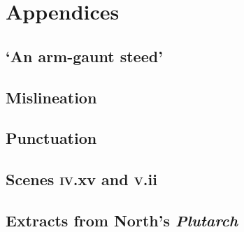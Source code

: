 \documentclass{book}
\begin{document}


\chapter {Appendices}

\section{`An arm-gaunt steed'}

\noindent\lorem [2314]

\section{Mislineation}

\noindent\lorem [14312]

\section{Punctuation}

\noindent\lorem [22315]

\section{Scenes \textsc{iv}.xv and \textsc{v}.ii}

\noindent\lorem [331]

\newpage

\newcommand {\GlossWidth}{.66in}
\newcommand {\GlossSep}  {10pt}


\Locus  \textus   {\leftmargin \\ \leftmargin + \GlossWidth + \GlossSep}
\Modus            {\measure {\textwidth - (\GlossWidth + \GlossSep)}}

\Novus \textus \gloss
\Locus         {\textrightmargin + \GlossSep \\ \leftmargin }
\Modus         {\rangedleft{\GlossWidth} \milestone}

\Facies \commissura {\llap{\P\kern 5em}}

\numerus {}

\section{Extracts from North's \textit{Plutarch}}
\end{document}
